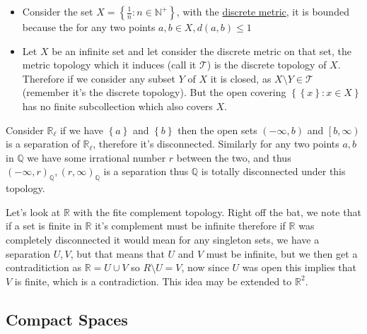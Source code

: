 \begin{itemize}
    \item Consider the set $ X =  \left\{ \frac{1}{n}: n \in  \mathbb{N} ^{ +  }  \right\}  $, with the \hyperref[example:discrete_metric]{discrete metric}, it is bounded because the for any two points $ a, b \in X, d\left( a, b \right)  \le 1 $  %
    \item Let $ X $ be an infinite set and let consider the discrete metric on that set,  the metric topology which it induces (call it $ \mathcal{ T }  $)  is the discrete topology of $ X $. Therefore if we consider any subset $ Y $ of $ X $ it is closed, as $ X \setminus Y \in  \mathcal{ T }  $ (remember it's the discrete topology). But the open covering $ \left\{ \left\{ x \right\} : x \in  X \right\}  $ has no finite subcollection which also covers $ X $.
\end{itemize}







Consider $ \mathbb{R} _{ \ell } $ if we have $ \left\{ a \right\}  $ and $ \left\{ b \right\}  $ then the open sets $ \left( - \infty , b \right) $ and $ \left[ b, \infty  \right) $ is a separation of $ \mathbb{R} _{ \ell }  $, therefore it's disconnected. Similarly for any two points $ a, b $  in $ \mathbb{Q}  $ we have some irrational number $ r $ between the two, and thus $ \left( - \infty , r \right) _{ \mathbb{Q}  } , \left( r, \infty  \right) _{ \mathbb{Q}  }  $ is a separation thus $ \mathbb{Q}  $ is totally disconnected under this topology. 

Let's look at $ \mathbb{R}  $ with the fite complement topology. Right off the bat, we note that if a set is finite in $ \mathbb{R}  $ it's complement must be infinite therefore if $ \mathbb{R}  $ was completely disconnected it would mean for any singleton sets, we have a separation $ U, V $, but that means that $ U $ and $ V $ must be infinite, but we then get a contraditiction as $ \mathbb{R} =  U \cup V $ so $ R \setminus U = V $, now since $ U $ was open this implies that $ V $ is finite, which is a contradiction. This idea may be extended to $ \mathbb{R} ^{ 2 }  $.


\subsection{Compact Spaces}

